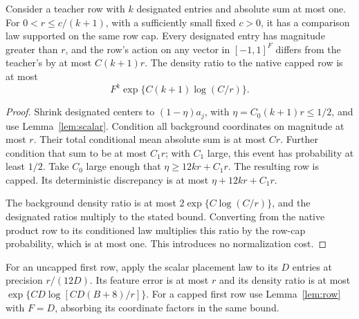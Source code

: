 \begin{lemma}
\label{lem:row}
Consider a teacher row with $k$ designated entries and absolute sum at most one. For $0<r\le c/(k+1)$, with a sufficiently small fixed $c>0$, it has a comparison law supported on the same row cap. Every designated entry has magnitude greater than $r$, and the row's action on any vector in $[-1,1]^F$ differs from the teacher's by at most $C(k+1)r$. The density ratio to the native capped row is at most
\[
 F^k\exp\{C(k+1)\log(C/r)\}.
\]
\end{lemma}
\begin{proof}
Shrink designated centers to $(1-\eta)a_j$, with
$\eta=C_0(k+1)r\le1/2$, and use Lemma~\ref{lem:scalar}. Condition all background coordinates on magnitude at most $r$. Their total conditional mean absolute sum is at most $Cr$. Further condition that sum to be at most $C_1r$; with $C_1$ large, this event has probability at least $1/2$. Take $C_0$ large enough that $\eta\ge12kr+C_1r$. The resulting row is capped. Its deterministic discrepancy is at most $\eta+12kr+C_1r$.

The background density ratio is at most $2\exp\{C\log(C/r)\}$, and the designated ratios multiply to the stated bound. Converting from the native product row to its conditioned law multiplies this ratio by the row-cap probability, which is at most one. This introduces no normalization cost.
\end{proof}

For an uncapped first row, apply the scalar placement law to its $D$ entries at precision $r/(12D)$. Its feature error is at most $r$ and its density ratio is at most
$\exp\{CD\log[CD(B+8)/r]\}$. For a capped first row use Lemma~\ref{lem:row} with $F=D$, absorbing its coordinate factors in the same bound.


